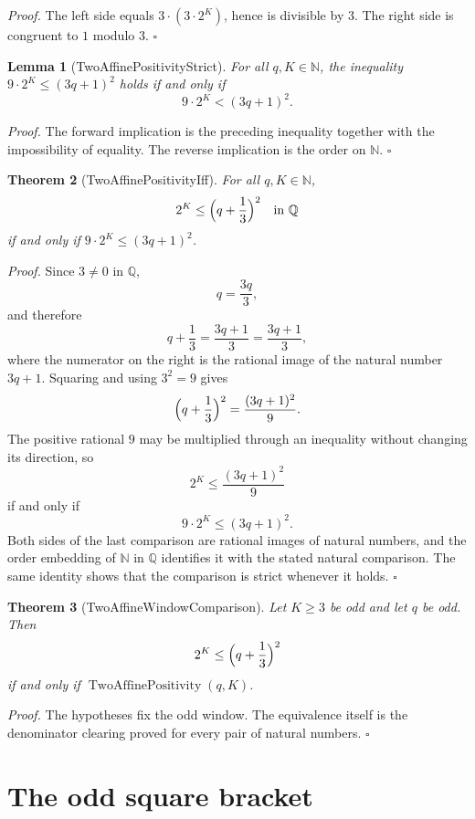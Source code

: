 \documentclass[11pt,letterpaper]{article}
\newcommand{\N}{\mathbb{N}}
\newcommand{\Q}{\mathbb{Q}}
\newtheorem{theorem}{Theorem}
\newtheorem{lemma}[theorem]{Lemma}
\newenvironment{proof}{\noindent\textit{Proof.}}{\hfill\(\square\)}
\begin{document}
\begin{proof}
The left side equals \(3\cdot(3\cdot 2^K)\), hence is divisible by \(3\).
The right side is congruent to \(1\) modulo \(3\).
\end{proof}

\begin{lemma}[TwoAffinePositivityStrict]
For all \(q,K\in\N\), the inequality
\(9\cdot 2^K\le(3q+1)^2\) holds if and only if
\[
9\cdot 2^K<(3q+1)^2.
\]
\end{lemma}

\begin{proof}
The forward implication is the preceding inequality together with the
impossibility of equality. The reverse implication is the order on \(\N\).
\end{proof}

\begin{theorem}[TwoAffinePositivityIff]
For all \(q,K\in\N\),
\[
2^K\le\Bigl(q+\frac13\Bigr)^2
\quad\text{in }\Q
\]
if and only if \(9\cdot 2^K\le(3q+1)^2\).
\end{theorem}

\begin{proof}
Since \(3\neq 0\) in \(\Q\),
\[
q=\frac{3q}{3},
\]
and therefore
\[
q+\frac13=\frac{3q+1}{3}=\frac{3q+1}{3},
\]
where the numerator on the right is the rational image of the natural number
\(3q+1\). Squaring and using \(3^2=9\) gives
\[
\Bigl(q+\frac13\Bigr)^2=\frac{(3q+1)^2}{9}.
\]
The positive rational \(9\) may be multiplied through an inequality without
changing its direction, so
\[
2^K\le\frac{(3q+1)^2}{9}
\]
if and only if
\[
9\cdot 2^K\le(3q+1)^2.
\]
Both sides of the last comparison are rational images of natural numbers, and
the order embedding of \(\N\) in \(\Q\) identifies it with the stated natural
comparison. The same identity shows that the comparison is strict whenever it
holds.
\end{proof}

\begin{theorem}[TwoAffineWindowComparison]
Let \(K\ge 3\) be odd and let \(q\) be odd. Then
\[
2^K\le\Bigl(q+\frac13\Bigr)^2
\]
if and only if \(\operatorname{TwoAffinePositivity}(q,K)\).
\end{theorem}

\begin{proof}
The hypotheses fix the odd window. The equivalence itself is the denominator
clearing proved for every pair of natural numbers.
\end{proof}

\section{The odd square bracket}
\end{document}
